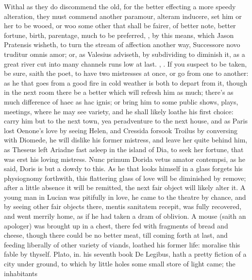 Withal as they do discommend the old, for the better effecting a more
speedy alteration, they must commend another paramour, alteram
inducere, set him or her to be wooed, or woo some other that shall be
fairer, of better note, better fortune, birth, parentage, much to be
preferred, , by this
means, which Jason Pratensis wisheth, to turn the stream of affection
another way, Successore novo truditur omnis amor; or, as Valesius
adviseth, by subdividing to diminish it, as a great river cut
into many channels runs low at last. , \etc{}. If you suspect to be taken, be sure, saith the
poet, to have two mistresses at once, or go from one to another: as he
that goes from a good fire in cold weather is both to depart from it,
though in the next room there be a better which will refresh him as
much; there's as much difference of haec as hac ignis; or bring him to
some public shows, plays, meetings, where he may see variety, and he
shall likely loathe his first choice: carry him but to the next town,
yea peradventure to the next house, and as Paris lost Oenone's love by
seeing Helen, and Cressida forsook Troilus by conversing with Diomede,
he will dislike his former mistress, and leave her quite behind him, as
Theseus left Ariadne fast asleep in the island of Dia, to seek
her fortune, that was erst his loving mistress. Nunc primum
Dorida vetus amator contempsi, as he said, Doris is but a dowdy to
this. As he that looks himself in a glass forgets his physiognomy
forthwith, this flattering glass of love will be diminished by remove;
after a little absence it will be remitted, the next fair object will
likely alter it. A young man in Lucian was pitifully in love, he
came to the theatre by chance, and by seeing other fair objects there,
mentis sanitatem recepit, was fully recovered,  and went merrily
home, as if he had taken a dram of oblivion. A mouse (saith an
apologer) was brought up in a chest, there fed with fragments of bread
and cheese, though there could be no better meat, till coming forth at
last, and feeding liberally of other variety of viands, loathed his
former life: moralise this fable by thyself. Plato, in. his seventh
book De Legibus, hath a pretty fiction of a city under ground, to
which by little holes some small store of light came; the inhabitants
